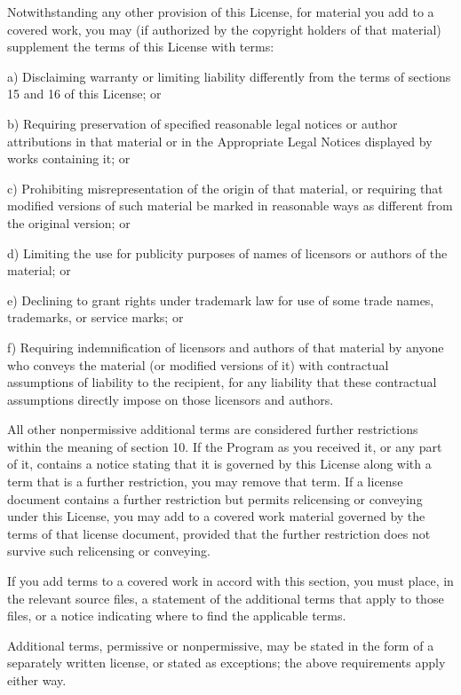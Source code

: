\documentclass[a4paper,10pt,english]{sphinxmanual}
\begin{document}
\begin{sphinxVerbatim}[commandchars=\\\{\}]
  Notwithstanding any other provision of this License, for material you
add to a covered work, you may (if authorized by the copyright holders of
that material) supplement the terms of this License with terms:

    a) Disclaiming warranty or limiting liability differently from the
    terms of sections 15 and 16 of this License; or

    b) Requiring preservation of specified reasonable legal notices or
    author attributions in that material or in the Appropriate Legal
    Notices displayed by works containing it; or

    c) Prohibiting misrepresentation of the origin of that material, or
    requiring that modified versions of such material be marked in
    reasonable ways as different from the original version; or

    d) Limiting the use for publicity purposes of names of licensors or
    authors of the material; or

    e) Declining to grant rights under trademark law for use of some
    trade names, trademarks, or service marks; or

    f) Requiring indemnification of licensors and authors of that
    material by anyone who conveys the material (or modified versions of
    it) with contractual assumptions of liability to the recipient, for
    any liability that these contractual assumptions directly impose on
    those licensors and authors.

  All other non\PYGZhy{}permissive additional terms are considered \PYGZdq{}further
restrictions\PYGZdq{} within the meaning of section 10.  If the Program as you
received it, or any part of it, contains a notice stating that it is
governed by this License along with a term that is a further
restriction, you may remove that term.  If a license document contains
a further restriction but permits relicensing or conveying under this
License, you may add to a covered work material governed by the terms
of that license document, provided that the further restriction does
not survive such relicensing or conveying.

  If you add terms to a covered work in accord with this section, you
must place, in the relevant source files, a statement of the
additional terms that apply to those files, or a notice indicating
where to find the applicable terms.

  Additional terms, permissive or non\PYGZhy{}permissive, may be stated in the
form of a separately written license, or stated as exceptions;
the above requirements apply either way.


\end{sphinxVerbatim}
\end{document}

